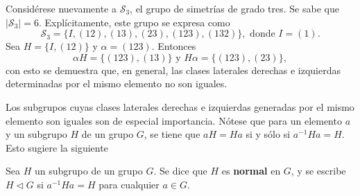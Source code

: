 \begin{ejemplo}
Considérese nuevamente a $\mathcal{S}_3$, el grupo de simetrías de grado tres. Se sabe que $\mid \mathcal{S}_3 \mid = 6$. Explícitamente, este grupo se expresa como \[ \mathcal{S}_3 = \{ I, (12), (13), (23), (123), (132) \}, \mbox{ donde } I = (1) .\]
Sea $H = \{ I, (12) \} $ y $\alpha = (123)$. Entonces \[ \alpha H = \{ (123), (13) \}   \mbox{ y } H\alpha = \{ (123), (23) \} ,\] con esto se demuestra que, en general, las clases laterales derechas e izquierdas determinadas por el mismo elemento no son iguales.
\end{ejemplo}
Los subgrupos cuyas clases laterales derechas e izquierdas generadas por el mismo elemento son iguales son de especial importancia. Nótese que para un elemento $a$ y un subgrupo $H$ de un grupo $G$, se tiene que $aH = Ha$ si y sólo si $a^{-1}Ha=H$. Esto sugiere la siguiente
\begin{definicion}
Sea $H$ un subgrupo de un grupo $G$. Se dice que $H$ es \textbf{normal} en $G$, y se escribe $H \triangleleft G$ si $a^{-1}Ha = H$ para cualquier $a \in G$.
\end{definicion}

